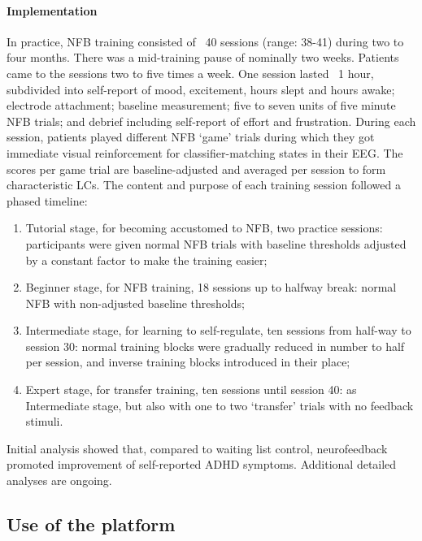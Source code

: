 \paragraph{Implementation}
In practice, NFB training consisted of ~40 sessions (range: 38-41) during two to four months. There was a mid-training pause of nominally two weeks. Patients came to the sessions two to five times a week. One session lasted ~1 hour, subdivided into self-report of mood, excitement, hours slept and hours awake; electrode attachment; baseline measurement; five to seven units of five minute NFB trials; and debrief including self-report of effort and frustration. During each session, patients played different NFB ‘game’ trials during which they got immediate visual reinforcement for classifier-matching states in their EEG. The scores per game trial are baseline-adjusted and averaged per session to form characteristic LCs. The content and purpose of each training session followed a phased timeline:

\begin{enumerate}
	\item Tutorial stage, for becoming accustomed to NFB, two practice sessions: participants were given normal NFB trials with baseline thresholds adjusted by a constant factor to make the training easier; 
	
	\item Beginner stage, for NFB training, 18 sessions up to halfway break: normal NFB with non-adjusted baseline thresholds; 
	
	\item Intermediate stage, for learning to self-regulate, ten sessions from half-way to session 30: normal training blocks were gradually reduced in number to half per session, and inverse training blocks introduced in their place; 
	
	\item Expert stage, for transfer training, ten sessions until session 40: as Intermediate stage, but also with one to two ‘transfer’ trials with no feedback stimuli.
	
\end{enumerate}


Initial analysis showed that, compared to waiting list control, neurofeedback promoted improvement of self-reported ADHD symptoms. Additional detailed analyses are ongoing.


\subsection{Use of the platform}
